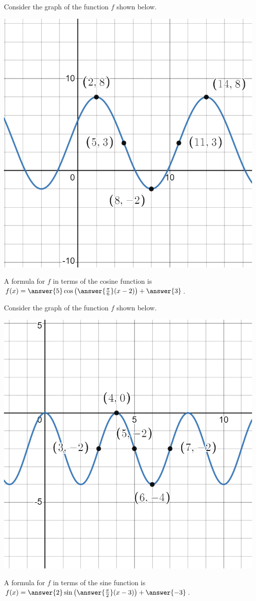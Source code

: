 \documentclass{ximera}
\author{Kenneth Berglund}
\begin{document}
\begin{exercise}
Consider the graph of the function $f$ shown below. 

\begin{image}
\includegraphics[width=0.8\linewidth]{TF9-graph.png}
\end{image}

A formula for $f$ in terms of the cosine function is $f(x) = \answer{5}\cos\left(\answer{\frac{\pi}{6}}(x - 2)\right) + \answer{3}$. 
\end{exercise} 

\begin{exercise}
Consider the graph of the function $f$ shown below. 

\begin{image}
\includegraphics[width=0.8\linewidth]{TF9-graph-2.png}
\end{image}

A formula for $f$ in terms of the sine function is $f(x) = \answer{2}\sin\left(\answer{\frac{\pi}{2}}(x - 3)\right) + \answer{-3}$. 
\end{exercise} 
\end{document}
